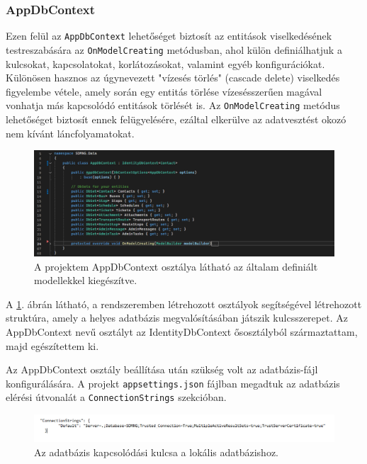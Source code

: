 \subsubsection{AppDbContext}
Ezen felül az \texttt{AppDbContext} lehetőséget biztosít az entitások viselkedésének testreszabására az \texttt{OnModelCreating} metódusban, ahol külön definiálhatjuk a kulcsokat, kapcsolatokat, korlátozásokat, valamint egyéb konfigurációkat. Különösen hasznos az úgynevezett "vízesés törlés" (cascade delete) viselkedés figyelembe vétele, amely során egy entitás törlése vízesésszerűen magával vonhatja más kapcsolódó entitások törlését is. Az \texttt{OnModelCreating} metódus lehetőséget biztosít ennek felügyelésére, ezáltal elkerülve az adatvesztést okozó nem kívánt láncfolyamatokat.

\begin{figure}[H]
\centering
\includegraphics[width=1\textwidth]{Szakdolgozat/Mellekletek/AppDbContext.PNG}
\caption{A projektem AppDbContext osztálya látható az általam definiált modellekkel kiegészítve. }
\label{fig:appdbcontext}
\end{figure}

A \ref{fig:appdbcontext}. ábrán látható, a rendszeremben létrehozott osztályok segítségével létrehozott struktúra, amely a helyes adatbázis megvalósításában játszik kulcsszerepet. Az AppDbContext nevű osztályt az IdentityDbContext ősosztályból származtattam, majd egészítettem ki.
\vspace{\baselineskip}


Az AppDbContext osztály beállítása után szükség volt az adatbázis-fájl konfigurálására. A projekt \texttt{appsettings.json} fájlban megadtuk az adatbázis elérési útvonalát a \texttt{ConnectionStrings} szekcióban.

\begin{figure}[H]
\centering
\includegraphics[width=1\textwidth]{Szakdolgozat/Mellekletek/Connectionstring.PNG}
\caption{Az adatbázis kapcsolódási kulcsa a lokális adatbázishoz.}
\label{fig:connectionstring}
\end{figure}

